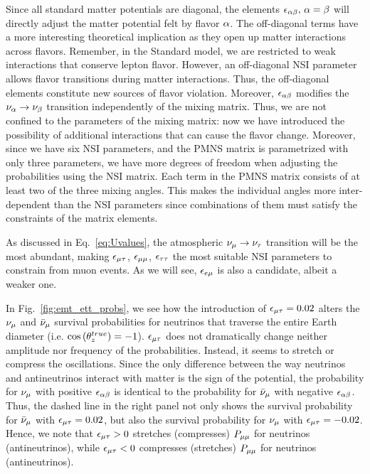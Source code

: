 Since all standard matter potentials are diagonal, 
the elements $\epsilon_{\alpha\beta},\, \alpha = \beta$ will directly adjust the matter potential felt 
by flavor $\alpha$. The off-diagonal terms have a more interesting theoretical implication as they open up matter interactions across flavors. Remember, in the Standard model,
we are restricted to weak interactions that conserve lepton flavor. However, an off-diagonal NSI parameter allows flavor transitions during matter interactions. Thus,
the off-diagonal elements constitute new sources of flavor violation.
Moreover, $\epsilon_{\alpha\beta}$ modifies the $\nu_\alpha \to \nu_\beta$ transition independently
of the mixing matrix. Thus, we are not confined to the parameters of the mixing matrix: now we have introduced the 
possibility of additional interactions that can cause the flavor change. Moreover, since we have six NSI parameters, and the PMNS
matrix is parametrized with only three parameters, we have more degrees of freedom when adjusting the probabilities using the NSI matrix. Each term in the PMNS matrix consists of at least
two of the three mixing angles. This makes the individual angles more inter-dependent than the NSI parameters since combinations of them must satisfy the constraints of the matrix elements.

As discussed in Eq.~\ref{eq:Uvalues}, the atmospheric $\nu_\mu \to \nu_\tau$ transition will be the most abundant, making $\epsilon_{\mu\tau}$, $\epsilon_{\mu\mu}$, $\epsilon_{\tau\tau}$ the most suitable
NSI parameters to constrain from muon events. As we will see, $\epsilon_{e\mu}$ is also a candidate, albeit a weaker one. 

In Fig.~\ref{fig:emt_ett_probs}, we see how the introduction of $\epsilon_{\mu\tau} = 0.02$ alters the $\nu_\mu$ and $\bar{\nu}_\mu$ survival probabilities
for neutrinos that traverse the entire Earth diameter (i.e. $\cos{(\theta_z^{true})} = -1$). $\epsilon_{\mu\tau}$ does not dramatically change neither
amplitude nor frequency of the probabilities. Instead, it seems to stretch or compress the oscillations. Since the 
only difference between the way neutrinos and antineutrinos interact with matter is the sign of the potential, the probability for
$\nu_\mu$ with positive $\epsilon_{\alpha\beta}$ is identical to the probability for $\bar{\nu}_\mu$ with negative $\epsilon_{\alpha\beta}$. Thus, the dashed line 
in the right panel not only shows the survival probability for $\bar{\nu}_\mu$ with $\epsilon_{\mu\tau}=0.02$, but also the survival probability for $\nu_\mu$ with $\epsilon_{\mu\tau}=-0.02$.
Hence, we note that $\epsilon_{\mu\tau} > 0$ stretches (compresses) $P_{\mu\mu}$ for neutrinos (antineutrinos), while $\epsilon_{\mu\tau} < 0$ compresses (stretches) $P_{\mu\mu}$ for neutrinos (antineutrinos).

